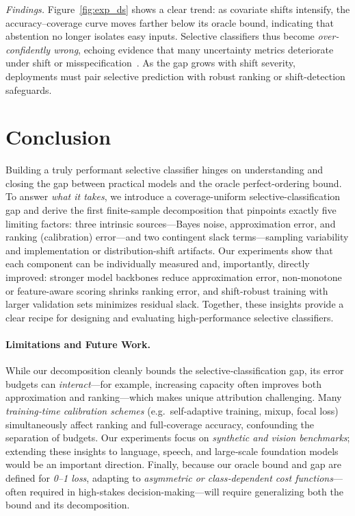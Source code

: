 \emph{Findings.} Figure~\ref{fig:exp_ds} shows a clear trend: as covariate shifts intensify, the accuracy–coverage curve moves farther below its oracle bound, indicating that abstention no longer isolates easy inputs. Selective classifiers thus become \emph{over-confidently wrong}, echoing evidence that many uncertainty metrics deteriorate under shift or misspecification~\citep{ovadia2019can}. As the gap grows with shift severity, deployments must pair selective prediction with robust ranking or shift-detection safeguards.

\section{Conclusion}
\label{sec:conclusion}

Building a truly performant selective classifier hinges on understanding and closing the gap between practical models and the oracle perfect-ordering bound.  To answer \emph{what it takes}, we introduce a coverage-uniform selective-classification gap and derive the first finite-sample decomposition that pinpoints exactly five limiting factors: three intrinsic sources—Bayes noise, approximation error, and ranking (calibration) error—and two contingent slack terms—sampling variability and implementation or distribution-shift artifacts.  Our experiments show that each component can be individually measured and, importantly, directly improved: stronger model backbones reduce approximation error, non-monotone or feature-aware scoring shrinks ranking error, and shift-robust training with larger validation sets minimizes residual slack.  Together, these insights provide a clear recipe for designing and evaluating high-performance selective classifiers.


\paragraph{Limitations and Future Work.}
While our decomposition cleanly bounds the selective‑classification gap, its error budgets can \emph{interact}—for example, increasing capacity often improves both approximation and ranking—which makes unique attribution challenging. Many \emph{training‑time calibration schemes} (e.g.\ self‑adaptive training, mixup, focal loss) simultaneously affect ranking and full‑coverage accuracy, confounding the separation of budgets. Our experiments focus on \emph{synthetic and vision benchmarks}; extending these insights to language, speech, and large‑scale foundation models would be an important direction. Finally, because our oracle bound and gap are defined for \emph{0–1 loss}, adapting to \emph{asymmetric or class‑dependent cost functions}---often required in high-stakes decision-making---will require generalizing both the bound and its decomposition.  